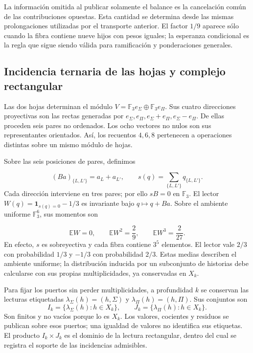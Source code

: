 La información omitida al publicar solamente el balance es la cancelación común de las contribuciones opuestas. Esta cantidad se determina desde las mismas prolongaciones utilizadas por el transporte anterior. El factor \(1/9\) aparece sólo cuando la fibra contiene nueve hijos con pesos iguales; la esperanza condicional es la regla que sigue siendo válida para ramificación y ponderaciones generales.

\subsection{Incidencia ternaria de las hojas y complejo rectangular}
\label{iv:cont:incidencia-rectangular}
Las dos hojas determinan el módulo \(V=\mathbb F_3e_\Sigma\oplus\mathbb F_3e_\Pi\). Sus cuatro direcciones proyectivas son las rectas generadas por \(e_\Sigma,e_\Pi,e_\Sigma+e_\Pi,e_\Sigma-e_\Pi\). De ellas proceden seis pares no ordenados. Los ocho vectores no nulos son sus representantes orientados. Así, los recuentos \(4,6,8\) pertenecen a operaciones distintas sobre un mismo módulo de hojas.

Sobre las seis posiciones de pares, definimos

\[
(Ba)_{\{L,L'\}}=a_L+a_{L'},
\qquad
s(q)=\sum_{\{L,L'\}}q_{\{L,L'\}}.
\]
Cada dirección interviene en tres pares; por ello \(sB=0\) en \(\mathbb F_3\). El lector \(W(q)=\mathbf1_{s(q)=0}-1/3\) es invariante bajo \(q\mapsto q+Ba\). Sobre el ambiente uniforme \(\mathbb F_3^6\), sus momentos son

\[
\mathbb EW=0,\qquad
\mathbb EW^2=\frac29,\qquad
\mathbb EW^3=\frac2{27}.
\]
En efecto, \(s\) es sobreyectiva y cada fibra contiene \(3^5\) elementos. El lector vale \(2/3\) con probabilidad \(1/3\) y \(-1/3\) con probabilidad \(2/3\). Estas medias describen el ambiente uniforme; la distribución inducida por un subconjunto de historias debe calcularse con sus propias multiplicidades, ya conservadas en \(X_k\).

Para fijar los puertos sin perder multiplicidades, a profundidad \(k\) se conservan las lecturas etiquetadas \(\lambda_\Sigma(h)=(h,\Sigma)\) y \(\lambda_\Pi(h)=(h,\Pi)\). Sus conjuntos son
\[
I_k=\{\lambda_\Sigma(h):h\in X_k\},\qquad
J_k=\{\lambda_\Pi(h):h\in X_k\}.
\]
Son finitos y no vacíos porque lo es \(X_k\). Los valores, cocientes y residuos se publican sobre esos puertos; una igualdad de valores no identifica sus etiquetas. El producto \(I_k\times J_k\) es el dominio de la lectura rectangular, dentro del cual se registra el soporte de las incidencias admisibles.

